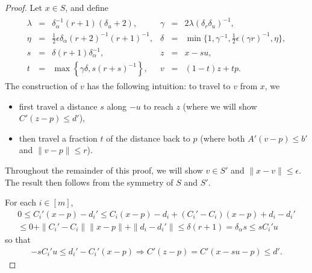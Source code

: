 \documentclass{article}
\theoremstyle{case}
\numberwithin{theorem}{subsection}
\begin{document}
\begin{proof}
Let $x \in S$, and define
\begin{align*}
\begin{array}{cccccc}
\lambda &=& \delta_{\alpha}^{-1}(r + 1) (\delta_u + 2), &
\gamma &=& 2\lambda(\delta_r \delta_u)^{-1}, \\
\eta    &=& \frac 1 2 \epsilon\delta_{\alpha}(r+2)^{-1}(r + 1)^{-1}, &
\delta &=& \min\bigg\{
1,
\gamma^{-1},
\frac 1 2 {\epsilon} (\gamma r)^{-1},
\eta
\bigg\}, \\
s &=& \delta(r + 1)\delta_{\alpha}^{-1}, &
z &=& x - su, \\
t &=& \max\left\{\gamma \delta, s(r+s)^{-1}\right\}, &
v &=& (1-t)z + t p.
\end{array}
\end{align*}
The construction of $v$ has the following intuition:
to travel to $v$ from $x$, we
\begin{itemize}
\item first travel a distance $s$ along $-u$ to reach $z$ (where we will show $C'(z-p) \le d'$),
\item then travel a fraction $t$ of the distance back to $p$ (where both $A'(v - p) \le b'$ and $\|v-p\| \le r$).
\end{itemize}
Throughout the remainder of this proof, we will show $v \in S'$ and $\|x - v\| \le \epsilon$.
The result then follows from the symmetry of $S$ and $S'$.


For each $i \in [m]$,
\begin{align*}
0 \le C_i'(x-p) - d_i'
\le C_i(x - p) - d_i + (C_i' - C_i)(x-p) + d_i - d_i'  \\
\le 0 + \|C_i' - C_i\| \|x - p\| + \|d_i - d_i'\| 
\le \delta (r+1)
= \delta_{\alpha} s \le sC_i'u
\end{align*}
so that
\begin{align}
-sC_i'u \le d_i' - C_i'(x - p) \Longrightarrow C'(z - p) = C'(x - su - p) \le d'. \label{reun_eqn3}
\end{align}


\end{proof}
\end{document}
